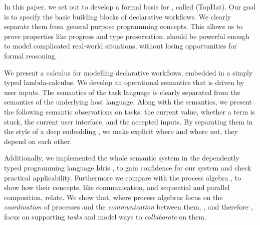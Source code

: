 


In this paper, we set out to develop a formal basis for \TOP, called \TOPHAT (TopHat).
Our goal is to specify the basic building blocks of declarative workflows.
We clearly separate them from general purpose programming concepts.
This allows us to prove properties like progress and type preservation.
\TOPHAT should be powerful enough to model complicated real-world situations,
without losing opportunities for formal reasoning.


We present a calculus for modelling declarative workflows, embedded in a simply typed lambda-calculus.
We develop an operational semantics that is driven by user inputs.
The semantics of the task language is clearly separated from the semantics of the underlying host language.
Along with the semantics, we present the following semantic observations on tasks: the current value, whether a term is stuck, the current user interface, and the accepted inputs.
By separating them in the style of a deep embedding \cite{conf/cefp/Gibbons13}, we make explicit where and where not, they depend on each other.

Additionally, we implemented the whole semantic system in the dependently typed programming language Idris \cite{journals/jfp/Brady13},
to gain confidence for our system and check practical applicability.
Furthermore we compare \TOPHAT  with the process algebra \CSP, to show how their concepts, like communication, and sequential and parallel composition, relate.
We show that, where process algebras focus on the \emph{coordination} of processes and the \emph{communication} between them,
\TOP, and therefore \TOPHAT, focus on supporting \emph{tasks} and model ways to \emph{collaborate} on them.



